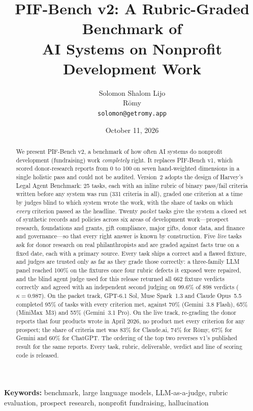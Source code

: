 \documentclass[11pt,a4paper]{article}
\title{%
  \textbf{PIF-Bench v2: A Rubric-Graded Benchmark of\\
  AI Systems on Nonprofit Development Work}%
}
\author{
  Solomon Shalom Lijo \\
  R\={o}my \\
  \texttt{solomon@getromy.app}
}
\date{October 11, 2026}
\newcommand{\romy}{R\={o}my}
\begin{document}
\maketitle

\begin{abstract}
We present PIF-Bench v2, a benchmark of how often AI systems do nonprofit development (fundraising) work \emph{completely} right. It replaces PIF-Bench v1, which scored donor-research reports from 0 to 100 on seven hand-weighted dimensions in a single holistic pass and could not be audited. Version~2 adopts the design of Harvey's Legal Agent Benchmark: 25 tasks, each with an inline rubric of binary pass/fail criteria written before any system was run (331 criteria in all), graded one criterion at a time by judges blind to which system wrote the work, with the share of tasks on which \emph{every} criterion passed as the headline. Twenty \emph{packet} tasks give the system a closed set of synthetic records and policies across six areas of development work---prospect research, foundations and grants, gift compliance, major gifts, donor data, and finance and governance---so that every right answer is known by construction. Five \emph{live} tasks ask for donor research on real philanthropists and are graded against facts true on a fixed date, each with a primary source. Every task ships a correct and a flawed fixture, and judges are trusted only as far as they grade those correctly: a three-family LLM panel reached 100\% on the fixtures once four rubric defects it exposed were repaired, and the blind agent judge used for this release returned all 662 fixture verdicts correctly and agreed with an independent second judging on 99.6\% of 898 verdicts ($\kappa = 0.987$). On the packet track, GPT-6.1 Sol, Muse Spark~1.3 and Claude Opus~5.5 completed 95\% of tasks with every criterion met, against 70\% (Gemini~3.8 Flash), 65\% (MiniMax~M3) and 55\% (Gemini~3.1 Pro). On the live track, re-grading the donor reports that four products wrote in April 2026, no product met every criterion for any prospect; the share of criteria met was 83\% for Claude.ai, 74\% for \romy, 67\% for Gemini and 60\% for ChatGPT. The ordering of the top two reverses v1's published result for the same reports. Every task, rubric, deliverable, verdict and line of scoring code is released.
\end{abstract}

\medskip
\noindent\textbf{Keywords:} benchmark, large language models, LLM-as-a-judge, rubric evaluation, prospect research, nonprofit fundraising, hallucination
\end{document}
